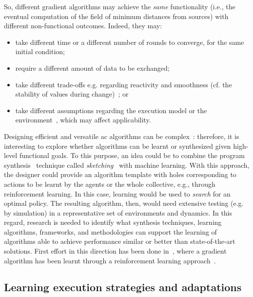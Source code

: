 So, different gradient algorithms may achieve the \emph{same} functionality (i.e., the eventual computation of the field of minimum distances from sources)
 with different non-functional outcomes.
%
Indeed, they may:
\begin{itemize}
  \item take different time or a different number of rounds to converge, for the same initial condition;
  \item require a different amount of data to be exchanged;
  \item take different trade-offs e.g. regarding reactivity and smoothness (cf. the stability of values during change)~\cite{DBLP:journals/cee/AudritoCDPV21,DBLP:conf/saso/AudritoCDV17};
 or 
 \item take different assumptions regarding the execution model or the environment~\cite{DBLP:journals/cee/AudritoCDPV21}, which may affect applicability.
\end{itemize}
Designing efficient and versatile \ac{ac} algorithms can be complex~\cite{DBLP:journals/cee/AudritoCDPV21,DBLP:conf/saso/AudritoCDV17}: therefore, 
 it is interesting to explore
 whether algorithms can be learnt or synthesized
 given high-level functional goals.
%
To this purpose,
 an idea could be to combine
 the program synthesis~\cite{DBLP:journals/ftpl/GulwaniPS17} technique called \emph{sketching}~\cite{solar2008program-synthesis-sketching}
 with machine learning.
%
With this approach,
 the designer could provide an algorithm template
 with holes corresponding to actions
 to be learnt by the agents or the whole collective,
 e.g., through reinforcement learning.
%
In this case, learning would be used to \emph{search}
 for an optimal policy.
%
The resulting algorithm, then, would need extensive testing (e.g. by simulation) in a representative set of environments and dynamics.
%
In this regard, research is needed to identify what synthesis techniques, learning algorithms, frameworks, and methodologies can support the learning of algorithms able to achieve performance similar or better than state-of-the-art solutions.
%
First effort in this direction has been done in~\cite{DBLP:conf/coordination/CasadeiPVN19}, where a gradient algorithm has been learnt through a reinforcement learning approach~.

\subsection{Learning execution strategies and adaptations}

